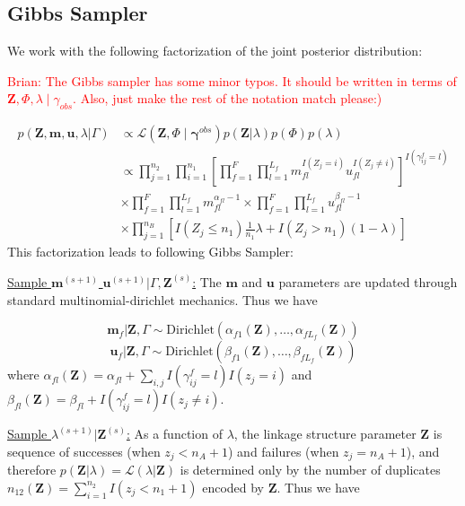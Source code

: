 \documentclass[12pt,letterpaper]{article}
\newcommand{\1}[1]{\mathbb{I}\!\left[#1\right]} %
\begin{document}
\newpage

\hypertarget{posterior-sampling}{%
	\subsection{Gibbs Sampler}
	\label{gibbs_sampling}}
We work with the following factorization of the joint posterior distribution:

\textcolor{red}{Brian: The Gibbs sampler has some minor typos. It should be written in terms of $\bm{Z}, \Phi, \lambda \mid \gamma_{obs}.$ Also, just make the rest of the notation match please:)}

\begin{align*}
p(\mathbf{Z}, \mathbf{m}, \mathbf{u}, \lambda|\Gamma) &\propto \mathcal{L}(\bm{Z}, \Phi \mid \bm{\gamma}^{obs}) p(\mathbf{Z} | \lambda) p(\Phi) p(\lambda) \\
&\propto \prod_{j=1}^{n_2}  \prod_{i=1}^{n_1}\left[ \prod_{f=1}^{F}\prod_{l=1}^{L_f} m_{fl}^{I(Z_j = i)}u_{fl}^{I(Z_j \neq i)}\right]^{I(\gamma_{ij}^f = l)} \\
&\times  \prod_{f=1}^{F}\prod_{l=1}^{L_f} m_{fl}^{\alpha_{fl} - 1}  \times\prod_{f=1}^{F}\prod_{l=1}^{L_f} u_{fl}^{\beta_{fl} - 1} \\
&\times \prod_{j=1}^{n_B} \left[I(Z_j \leq n_1)\frac{1}{n_1}\lambda + I(Z_j > n_1)(1 - \lambda)\right]
\end{align*}
This factorization leads to following Gibbs Sampler:

\underline{Sample $\mathbf{m}^{(s+1)}$ $\mathbf{u}^{(s+1)}|\Gamma, \mathbf{Z}^{(s)}$:}
The \(\mathbf{m}\) and \(\mathbf{u}\) parameters are updated through
standard multinomial-dirichlet mechanics. Thus we have

\[\mathbf{m}_f|\mathbf{Z}, \Gamma \sim \text{Dirichlet}(\alpha_{f1}(\mathbf{Z}), \ldots, \alpha_{fL_f}(\mathbf{Z}))\]
\[\mathbf{u}_f|\mathbf{Z}, \Gamma \sim \text{Dirichlet}(\beta_{f1}(\mathbf{Z}), \ldots, \beta_{fL_f}(\mathbf{Z}))\]
where
\(\alpha_{fl}(\mathbf{Z})= \alpha_{fl} + \sum_{i,j} I(\gamma_{ij}^f = l) I(z_j = i)\)
and
\(\beta_{fl}(\mathbf{Z})= \beta_{fl} + I(\gamma_{ij}^f = l) I(z_j \neq i)\).

\underline{Sample $\lambda^{(s+1)}|\mathbf{Z}^{(s)}$:} As a function of
\(\lambda\), the linkage structure parameter \(\mathbf{Z}\) is sequence
of successes (when \(z_j < n_A + 1\)) and failures (when
\(z_j = n_A + 1\)), and therefore
\(p(\mathbf{Z}|\lambda) = \mathcal{L}(\lambda|\mathbf{Z})\) is
determined only by the number of duplicates
$n_{12}(\mathbf{Z}) = \sum_{i=1}^{n_2}I(z_j < n_1 + 1)$ encoded by
$\mathbf{Z}$. Thus we have
\end{document}
